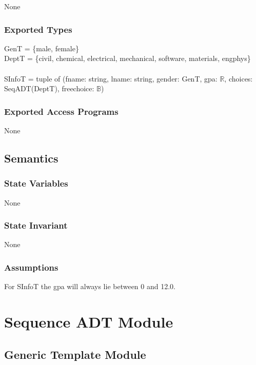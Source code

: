 \documentclass[12pt]{article}
\begin{document}
None

\subsubsection* {Exported Types}

GenT = \{male, female\}\\ 
DeptT = \{civil, chemical, electrical, mechanical, software, materials, engphys\}\\
~\\
SInfoT = tuple of (fname: string, lname: string, gender: GenT, gpa:
$\mathbb{R}$, choices: SeqADT(DeptT), freechoice: $\mathbb{B}$)

\subsubsection* {Exported Access Programs}

None

\subsection* {Semantics}

\subsubsection* {State Variables}

None

\subsubsection* {State Invariant}

None

\subsubsection* {Assumptions}

For SInfoT the gpa will always lie between 0 and 12.0.

\newpage

\section* {Sequence ADT Module}

\subsection*{Generic Template Module}
\end{document}
